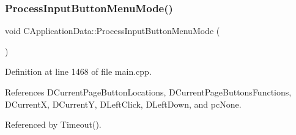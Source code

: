 \subsubsection{\texorpdfstring{Process\+Input\+Button\+Menu\+Mode()}{ProcessInputButtonMenuMode()}}
{\footnotesize\ttfamily void C\+Application\+Data\+::\+Process\+Input\+Button\+Menu\+Mode (\begin{DoxyParamCaption}{ }\end{DoxyParamCaption})\hspace{0.3cm}{\ttfamily [protected]}}



Definition at line 1468 of file main.\+cpp.



References D\+Current\+Page\+Button\+Locations, D\+Current\+Page\+Buttons\+Functions, D\+CurrentX, D\+CurrentY, D\+Left\+Click, D\+Left\+Down, and pc\+None.



Referenced by Timeout().


